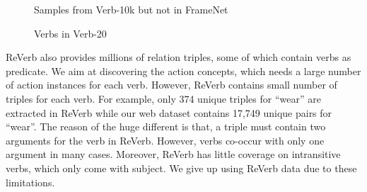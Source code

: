 \begin{figure}[th]
\centering
{}
\caption{Samples from Verb-10k but not in FrameNet}
\label{fig:verb10k}
\end{figure}


\begin{figure}[th]
\centering
{}
\caption{Verbs in Verb-20}
\label{fig:verb20}
\end{figure}

ReVerb also provides millions of relation triples, some of which contain
verbs as predicate.
We aim at discovering the action concepts,
which needs a large number of action instances
for each verb. However, ReVerb contains small number of triples for each verb.
For example, only 374 unique triples for ``wear'' are
extracted in ReVerb while our web dataset contains 17,749 unique
 pairs for ``wear''.
The reason of the huge different is that,
a triple must contain two arguments for the verb in ReVerb. However,
verbs co-occur with only one argument in many cases.
Moreover, ReVerb has little coverage on
intransitive verbs, which only come with subject.
We give up using ReVerb data due to these limitations.

